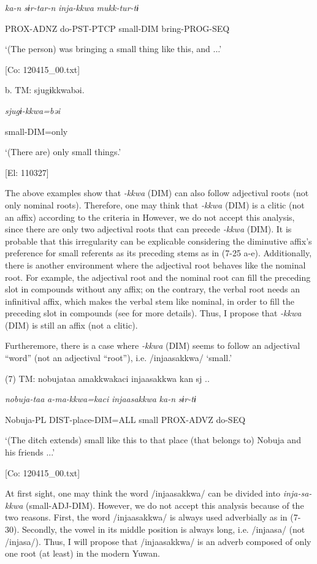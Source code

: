       \textit{ka-n}  \textit{sɨr-tar-n}  \textit{inja-kkwa}  \textit{mukk-tur-tɨ}

      PROX-ADNZ  do-PST-PTCP  small-DIM  bring-PROG-SEQ

      ‘(The person) was bringing a small thing like this, and ...’

      [Co: 120415\_00.txt]

  b.  TM:  sjugɨkkwabəi.

      \textit{sjugɨ-kkwa=bəi}

      small-DIM=only

      ‘(There are) only small things.’

      [El: 110327]

The above examples show that \textit{{}-kkwa} (DIM) can also follow adjectival roots (not only nominal roots). Therefore, one may think that \textit{{}-kkwa} (DIM) is a clitic (not an affix) according to the criteria in  However, we do not accept this analysis, since there are only two adjectival roots that can precede \textit{-kkwa} (DIM). It is probable that this irregularity can be explicable considering the diminutive affix’s preference for small referents as its preceding stems as in (7-25 a-e). Additionally, there is another environment where the adjectival root behaves like the nominal root. For example, the adjectival root and the nominal root can fill the preceding slot in compounds without any affix; on the contrary, the verbal root needs an infinitival affix, which makes the verbal stem like nominal, in order to fill the preceding slot in compounds (see  for more details). Thus, I propose that \textit{{}-kkwa} (DIM) is still an affix (not a clitic).

Furtheremore, there is a case where \textit{{}-kkwa} (DIM) seems to follow an adjectival “word” (not an adjectival “root”), i.e. /injaasakkwa/ ‘small.’

(7)  TM:  nobujataa  amakkwakaci  injaasakkwa  kan  sj ..

    \textit{nobuja-taa}  \textit{a-ma-kkwa=kaci}  \textit{injaasakkwa}  \textit{ka-n}  \textit{sɨr-tɨ}

    Nobuja-PL  DIST-place-DIM=ALL  small  PROX-ADVZ  do-SEQ

    ‘(The ditch extends) small like this to that place (that belongs to) Nobuja and his friends ...’

    [Co: 120415\_00.txt]

At first sight, one may think the word /injaasakkwa/ can be divided into \textit{inja-sa-kkwa} (small-ADJ-DIM). However, we do not accept this analysis because of the two reasons. First, the word /injaasakkwa/ is always used adverbially as in (7-30). Secondly, the vowel in its middle position is always long, i.e. /injaasa/ (not /injasa/). Thus, I will propose that /injaasakkwa/ is an adverb composed of only one root (at least) in the modern Yuwan.
